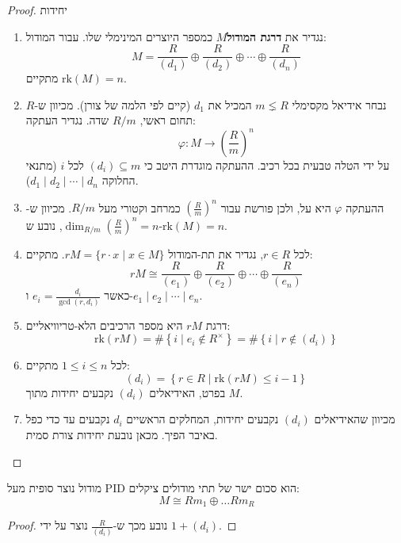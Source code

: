 \documentclass{tstextbook}
\begin{document}
\begin{proof}
יחידות

  \begin{enumerate}
    \item נגדיר את \textbf{דרגת המודול}\(M\) כמספר היוצרים המינימלי שלו. עבור המודול: 
$$M = \frac{R}{(d_1)} \oplus \frac{R}{(d_2)} \oplus \cdots \oplus \frac{R}{(d_n)}
$$
מתקיים \(\text{rk}(M) = n\).


    \item נבחר אידיאל מקסימלי \(m \lneq R\) המכיל את \(d_1\) (קיים לפי הלמה של צורן). מכיוון ש-\(R\) תחום ראשי, \(R/m\) שדה. נגדיר העתקה: 
$$\varphi: M \to \left( \frac{R}{m} \right)^n
$$
על ידי הטלה טבעית בכל רכיב. ההעתקה מוגדרת היטב כי \((d_i) \subseteq m\) לכל \(i\) (מתנאי החלוקה \(d_1 \mid d_2 \mid \cdots \mid d_n\)).


    \item ההעתקה \(\varphi\) היא על, ולכן פורשת עבור \(\left( \frac{R}{m} \right)^n\) כמרחב וקטורי מעל \(R/m\). מכיוון ש-\(\dim_{R/m} \left( \frac{R}{m} \right)^n = n\), נובע ש-\(\text{rk}(M) = n\). 


    \item לכל \(r \in R\), נגדיר את תת-המודול \(rM = \{ r \cdot x \mid x \in M \}\). מתקיים: 
$$ rM \cong \frac{R}{(e_1)} \oplus \frac{R}{(e_2)} \oplus \cdots \oplus \frac{R}{(e_n)} $$
כאשר \(e_i = \frac{d_i}{\gcd(r, d_i)}\) ו-\(e_1 \mid e_2 \mid \cdots \mid e_n\).


    \item דרגת \(rM\) היא מספר הרכיבים הלא-טריוויאליים: 
$$ \text{rk}(rM) = \#\left\{ i \mid e_i \notin R^\times \right\} = \#\left\{ i \mid r \notin (d_i) \right\} $$


    \item לכל \(1 \leq i \leq n\) מתקיים: 
$$ (d_i) = \left\{ r \in R \mid \text{rk}(rM) \leq i-1 \right\} $$
בפרט, האידיאלים \((d_i)\) נקבעים יחידות מתוך \(M\).


    \item מכיוון שהאידיאלים \((d_i)\) נקבעים יחידות, המחלקים הראשיים \(d_i\) נקבעים עד כדי כפל באיבר הפיך. מכאן נובעת יחידות צורת סמית. 


  \end{enumerate}
\end{proof}
\begin{corollary}
מודול נוצר סופית מעל PID הוא סכום ישר של תתי מודולים ציקלים:
$$M\cong  Rm_{1} \oplus \dots Rm_{R}$$

\end{corollary}
\begin{proof}
נובע מכך ש-\(\frac{R}{(d_{i})}\) נוצר על ידי \(1+(d_{i})\).

\end{proof}
\end{document}

